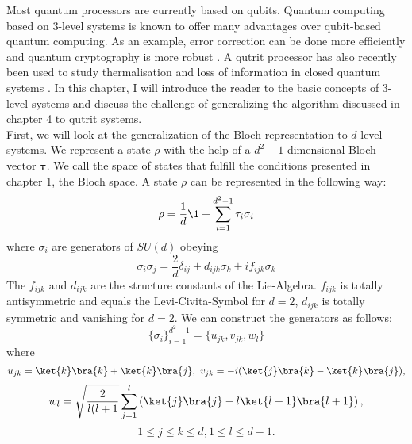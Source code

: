 Most quantum processors are currently based on qubits.
Quantum computing based on $3$-level systems is known to offer many advantages over qubit-based quantum computing.
As an example, error correction can be done more efficiently \cite{campbell14} and quantum cryptography is more robust \cite{bechmann00}.
A qutrit processor has also recently been used to study thermalisation and loss of information in closed quantum systems \cite{blok20}.
In this chapter, I will introduce the reader to the basic concepts of $3$-level systems and discuss the challenge of generalizing the algorithm discussed in chapter 4 to qutrit systems.\\
First, we will look at the generalization of the Bloch representation to $d$-level systems.
We represent a state $\rho$ with the help of a $d^2-1$-dimensional Bloch vector $\bm{\tau}$.
We call the space of states that fulfill the conditions presented in chapter 1, the Bloch space.
A state $\rho$ can be represented in the following way:
$$\rho = \frac{1}{d} \1 + \sum_{i=1}^{d^2-1} \tau_i \sigma_i$$
where $\sigma_i$ are generators of $SU(d)$ obeying
\begin{equation}\label{sig}
	\sigma_i\sigma_j = \frac{2}{d}\delta_{ij} + d_{ijk}\sigma_k + if_{ijk}\sigma_k
\end{equation}
The $f_{ijk}$ and $d_{ijk}$ are the structure constants of the Lie-Algebra.
$f_{ijk}$ is totally antisymmetric and equals the Levi-Civita-Symbol for $d=2$, $d_{ijk}$ is totally symmetric and vanishing for $d=2$.
We can construct the generators as follows:\cite{kimura03}
 \[
\{\sigma_i\}^{d^2-1}_{i=1} = \{u_{jk},v_{jk},w_l\}
\]
where
$$
	u_{jk} = \ket{k}\bra{k}+\ket{k}\bra{j}, ~ v_{jk} = -i(\ket{j}\bra{k}-\ket{k}\bra{j}),
$$
$$
	w_l = \sqrt{\frac{2}{l(l+1}} \sum_{j=1}^{l} \left( \ket{j}\bra{j}-l\ket{l+1}\bra{l+1} \right),$$
	$$ 1\le j\le k\le d, 1\le l\le d-1.$$

